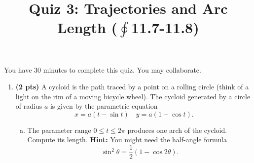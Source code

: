 \documentclass[12pt]{article}
\title{\flushleft\vspace{-1.5pc}\Large
	\bf Quiz 3: Trajectories and Arc Length ($\textstyle\oint$11.7-11.8)}
\author{}
\date{}
\begin{document}
\maketitle

\vspace{-5pc}

\vspace{1pc}
 You have 30 minutes to complete this quiz.  You may collaborate.  

\vspace{1pc}
\begin{enumerate}[1.]
\item {\bf (2 pts)} A cycloid is the path traced by a point on a rolling circle (think of a light on the rim of a moving bicycle wheel).  The cycloid generated by a circle of radius $a$ is given by the parametric equation 
\[
x=a(t-\sin{t}) \quad y=a(1-\cos{t}).
\]
\begin{enumerate}[(a)]
\item The parameter range $0\leq t\leq 2\pi$ produces one arch of the cycloid.  Compute its length.  {\bf Hint:} You might need the half-angle formula
\[
\sin^2{\theta}=\textstyle\frac{1}{2}\left(1-\cos{2\theta}\right).
\]


\end{enumerate}
\end{enumerate}
\end{document}

